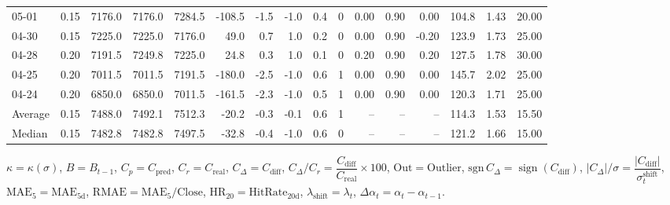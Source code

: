 \begin{threeparttable}
{\begin{tabular}{lrrrrrrrrrrrrrrr}
  05-01 &     0.15 & 7176.0 & 7176.0 & 7284.5 &     -108.5 &           -1.5 &                     -1.0 &                 0.4 &              0 &       0.00 &      0.90 &           0.00 &            104.8 &            1.43 &                  20.00 \\
  04-30 &     0.15 & 7225.0 & 7225.0 & 7176.0 &       49.0 &            0.7 &                      1.0 &                 0.2 &              0 &       0.00 &      0.90 &          -0.20 &            123.9 &            1.73 &                  25.00 \\
  04-28 &     0.20 & 7191.5 & 7249.8 & 7225.0 &       24.8 &            0.3 &                      1.0 &                 0.1 &              0 &       0.20 &      0.90 &           0.20 &            127.5 &            1.78 &                  30.00 \\
  04-25 &     0.20 & 7011.5 & 7011.5 & 7191.5 &     -180.0 &           -2.5 &                     -1.0 &                 0.6 &              1 &       0.00 &      0.90 &           0.00 &            145.7 &            2.02 &                  25.00 \\
  04-24 &     0.20 & 6850.0 & 6850.0 & 7011.5 &     -161.5 &           -2.3 &                     -1.0 &                 0.5 &              1 &       0.00 &      0.90 &           0.00 &            120.3 &            1.71 &                  25.00 \\
Average &     0.15 & 7488.0 & 7492.1 & 7512.3 &      -20.2 &           -0.3 &                     -0.1 &                 0.6 &              1 &         -- &        -- &             -- &            114.3 &            1.53 &                  15.50 \\
 Median &     0.15 & 7482.8 & 7482.8 & 7497.5 &      -32.8 &           -0.4 &                     -1.0 &                 0.6 &              0 &         -- &        -- &             -- &            121.2 &            1.66 &                  15.00 \\
\bottomrule
\end{tabular}
}
\begin{tablenotes}\footnotesize
\item $\kappa=\kappa(\sigma)$, $B=B_{t-1}$, $C_p=C_{\text{pred}}$, $C_r=C_{\text{real}}$, $C_\Delta=C_{\text{diff}}$, $C_\Delta/C_r=\dfrac{C_{\text{diff}}}{C_{\text{real}}}\times100$, $\mathrm{Out}=\text{Outlier}$, $\mathrm{sgn}\,C_\Delta=\operatorname{sign}(C_{\text{diff}})$, $|C_\Delta|/\sigma=\dfrac{|C_{\text{diff}}|}{\sigma_t^{\text{shift}}}$, $\mathrm{MAE}_5=\mathrm{MAE}_{5\text{d}}$, $\mathrm{RMAE}= \mathrm{MAE}_5 / \text{Close}$, $\mathrm{HR}_{20}=\mathrm{HitRate}_{20\text{d}}$, 
$\lambda_{\text{shift}}=\lambda_t$, 
$\Delta\alpha_t=\alpha_t-\alpha_{t-1}$.
\end{tablenotes}
\end{threeparttable}
\endgroup

